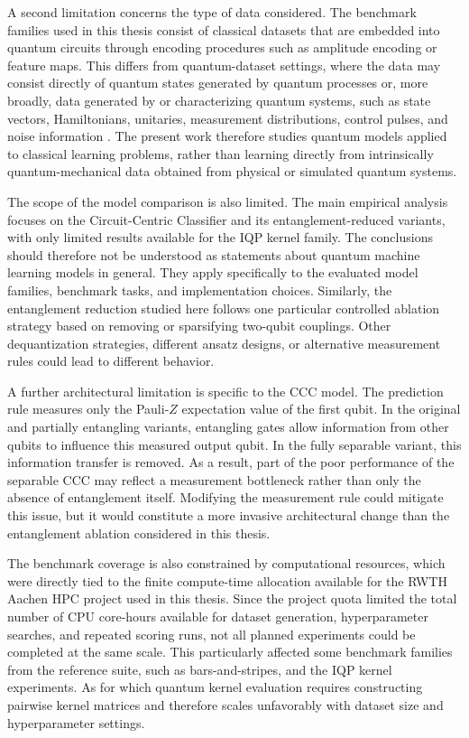 \documentclass[12pt,a4paper,openany]{report}
\let\parencite\citep
\begin{document}
A second limitation concerns the type of data considered. The benchmark families used in this thesis consist of classical datasets that are embedded into quantum circuits through encoding procedures such as amplitude encoding or feature maps. This differs from quantum-dataset settings, where the data may consist directly of quantum states generated by quantum processes \parencite{schatzki2021entangled} or, more broadly, data generated by or characterizing quantum systems, such as state vectors, Hamiltonians, unitaries, measurement distributions, control pulses, and noise information \parencite{perrier2021qdataset}. The present work therefore studies quantum models applied to classical learning problems, rather than learning directly from intrinsically quantum-mechanical data obtained from physical or simulated quantum systems.

The scope of the model comparison is also limited. The main empirical analysis focuses on the Circuit-Centric Classifier and its entanglement-reduced variants, with only limited results available for the IQP kernel family. The conclusions should therefore not be understood as statements about quantum machine learning models in general. They apply specifically to the evaluated model families, benchmark tasks, and implementation choices. Similarly, the entanglement reduction studied here follows one particular controlled ablation strategy based on removing or sparsifying two-qubit couplings. Other dequantization strategies, different ansatz designs, or alternative measurement rules could lead to different behavior. 

A further architectural limitation is specific to the CCC model. The prediction rule measures only the Pauli-\(Z\) expectation value of the first qubit. In the original and partially entangling variants, entangling gates allow information from other qubits to influence this measured output qubit. In the fully separable variant, this information transfer is removed. As a result, part of the poor performance of the separable CCC may reflect a measurement bottleneck rather than only the absence of entanglement itself. Modifying the measurement rule could mitigate this issue, but it would constitute a more invasive architectural change than the entanglement ablation considered in this thesis. 

The benchmark coverage is also constrained by computational resources, which were directly tied to the finite compute-time allocation available for the RWTH Aachen HPC project used in this thesis. Since the project quota limited the total number of CPU core-hours available for dataset generation, hyperparameter searches, and repeated scoring runs, not all planned experiments could be completed at the same scale. This particularly affected some benchmark families from the reference suite, such as bars-and-stripes, and the IQP kernel experiments. As for which quantum kernel evaluation requires constructing pairwise kernel matrices and therefore scales unfavorably with dataset size and hyperparameter settings. 
\end{document}
